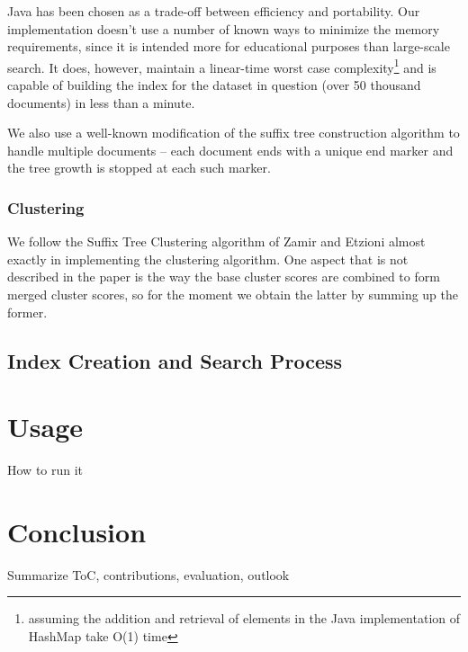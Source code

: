 \documentclass[11pt, a4paper, abstraction]{scrartcl}
\begin{document}
Java has been chosen as a trade-off between efficiency and portability. Our implementation doesn't use a number of known ways to minimize the memory requirements, since it is intended more for educational purposes than large-scale search. It does, however, maintain a linear-time worst case complexity\footnote{assuming the addition and retrieval of elements in the Java implementation of HashMap take O(1) time} and is capable of building the index for the dataset in question (over 50 thousand documents) in less than a minute.

We also use a well-known modification of the suffix tree construction algorithm to handle multiple documents -- each document ends with a unique end marker and the tree growth is stopped at each such marker.

\subsubsection{Clustering}
We follow the Suffix Tree Clustering algorithm of Zamir and Etzioni almost exactly in implementing the clustering algorithm. One aspect that is not described in the paper is the way the base cluster scores are combined to form merged cluster scores, so for the moment we obtain the latter by summing up the former.
 
\subsection{Index Creation and Search Process}

\section{Usage}

How to run it

% 
% 
% 
% 
% 
% 

\section{Conclusion}

Summarize ToC, contributions, evaluation, outlook
\end{document}
